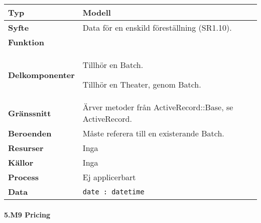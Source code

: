 \documentclass[a4paper, twoside, 11pt, titlepage]{article}
\begin{document}
			\begin {table} [ht] \begin{tabular} {  p{3.5cm} p{11.6cm} }
				\hline
				{\sffamily\textbf{Typ}} & {Modell} \\
				\hline
				{\sffamily\textbf{Syfte}} & {Data för en enskild föreställning (SR1.10).} \\
				\hline
				{\sffamily\textbf{Funktion}} & { } \\
				\hline
				{\sffamily\textbf{Delkomponenter}} & {Tillhör en Batch.

Tillhör en Theater, genom Batch.} \\
				\hline
				{\sffamily\textbf{Gränssnitt}} & {Ärver metoder från ActiveRecord::Base, se ActiveRecord.} \\
				\hline
				{\sffamily\textbf{Beroenden}} & {Måste referera till en existerande Batch.} \\
				\hline
				{\sffamily\textbf{Resurser}} & {Inga} \\
				\hline
				{\sffamily\textbf{Källor}} & {Inga} \\
				\hline
				{\sffamily\textbf{Process}} & {Ej applicerbart} \\
				\hline
				{\sffamily\textbf{Data}} & {{\tt date : datetime}} \\
				\hline
			\end{tabular} \end{table} \FloatBarrier


			\paragraph{5.M9 Pricing}\
\end{document}
